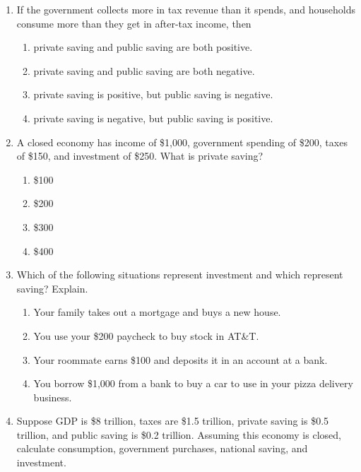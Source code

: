 \documentclass{article}
\begin{document}
\begin{enumerate}

\item If the government collects more in tax revenue than it spends, and households consume more than they get in after-tax income, then

	\begin{enumerate}
	
	\item private saving and public saving are both positive.
	
	\item private saving and public saving are both negative.
	
	\item private saving is positive, but public saving is negative.
	
	\item private saving is negative, but public saving is positive.
	
	\end{enumerate}
	
\item A closed economy has income of \$1,000, government spending of \$200, taxes of \$150, and investment of \$250. What is private saving?

	\begin{enumerate}
	
	\item \$100
	
	\item \$200
	
	\item \$300
	
	\item \$400
	
	\end{enumerate}
	
\item Which of the following situations represent investment and which represent saving? Explain.

	\begin{enumerate}
	
	\item Your family takes out a mortgage and buys a new house.
	
	\item You use your \$200 paycheck to buy stock in AT\&T.
	
	\item Your roommate earns \$100 and deposits it in an account at a bank.
	
	\item You borrow \$1,000 from a bank to buy a car to use in your pizza delivery business.
	
	\end{enumerate}
	
\item Suppose GDP is \$8 trillion, taxes are \$1.5 trillion, private saving is \$0.5 trillion, and public saving is \$0.2 trillion. Assuming this economy is closed, calculate consumption, government purchases, national saving, and investment.	

\end{enumerate}
\end{document}
